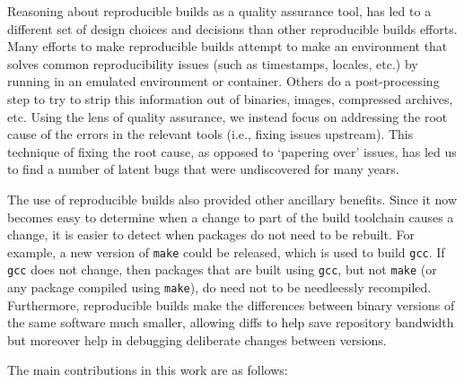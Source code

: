 Reasoning about reproducible builds as a quality assurance tool, has led to
a different set of design choices and decisions than other reproducible
builds efforts.  Many efforts to make reproducible builds attempt to make
an environment that solves common reproducibility issues (such as
timestamps, locales, etc.) by running in an emulated environment or
container.   Others do a post-processing step to try to strip this
information out of binaries, images, compressed archives, etc.  Using the
lens of quality assurance, we instead focus on addressing the root cause of
the errors in the relevant tools (i.e., fixing issues upstream).  This
technique of fixing the root cause, as opposed to `papering over' issues,
has led us to find a number of latent bugs that were undiscovered for many
years. 

The use of reproducible builds also provided other ancillary benefits.  Since
it now becomes easy to determine when a change to part of the build toolchain
causes a change, it is easier to detect when packages do not need to be 
rebuilt.  For example, a new version of {\tt make} could be released, which
is used to build {\tt gcc}.  If {\tt gcc} does not change, then packages
that are built using {\tt gcc}, but not {\tt make} (or any package compiled
using {\tt make}), do need not to be needleessly recompiled.
Furthermore, reproducible builds make the differences between
binary versions of the same software much smaller, allowing diffs to help
save repository bandwidth but moreover help in debugging deliberate changes
between versions.

The main contributions in this work are as follows:

